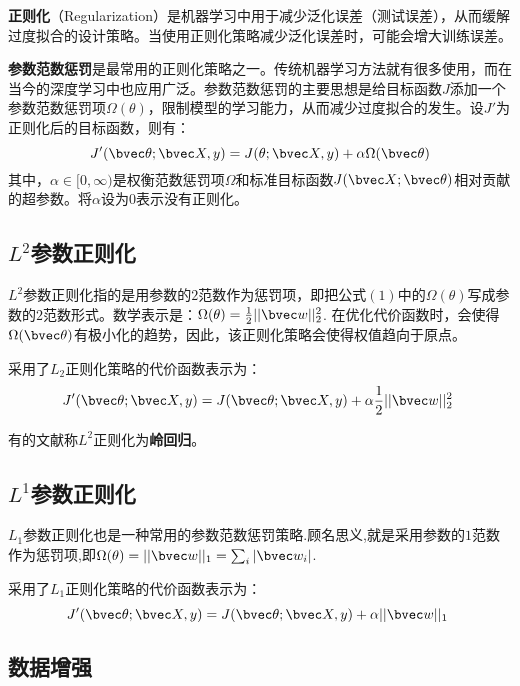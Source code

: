 
\textbf{正则化}（Regularization）是机器学习中用于减少泛化误差（测试误差），从而缓解过度拟合的设计策略。当使用正则化策略减少泛化误差时，可能会增大训练误差。

\textbf{参数范数惩罚}是最常用的正则化策略之一。传统机器学习方法就有很多使用，而在当今的深度学习中也应用广泛。参数范数惩罚的主要思想是给目标函数$J$添加一个参数范数惩罚项$\Omega(\theta)$，限制模型的学习能力，从而减少过度拟合的发生。设$J'$为正则化后的目标函数，则有：
\begin{equation}
J'(\bvec \theta;\bvec X,y)=J(\theta;\bvec X,y)+\alpha\Omega(\bvec \theta)
\end{equation}
其中，$\alpha\in[0,\infty)$是权衡范数惩罚项$\Omega$和标准目标函数$J(\bvec X;\bvec \theta)$相对贡献的超参数。将$\alpha$设为$0$表示没有正则化。


\subsection{$L^2$参数正则化}

$L^2$参数正则化指的是用参数的$2$范数作为惩罚项，即把公式$(1)$中的$\Omega(\theta)$写成参数的$2$范数形式。数学表示是：$\Omega(\theta)=\frac{1}{2}||\bvec w||_2^2$.
在优化代价函数时，会使得$\Omega(\bvec \theta)$有极小化的趋势，因此，该正则化策略会使得权值趋向于原点。

采用了$L_2$正则化策略的代价函数表示为：
\begin{equation}
J'(\bvec \theta;\bvec X,y)=J(\bvec \theta;\bvec X,y)+\alpha\frac{1}{2}||\bvec w||_2^2~
\end{equation}

有的文献称$L^2$正则化为\textbf{岭回归}。


\subsection{$L^1$参数正则化}

$L_1$参数正则化也是一种常用的参数范数惩罚策略.顾名思义,就是采用参数的$1$范数作为惩罚项,即$\Omega(\theta)=||\bvec w||_1=\sum_i|\bvec w_i|$.

采用了$L_1$正则化策略的代价函数表示为：
\begin{equation}
J'(\bvec \theta;\bvec X,y)=J(\bvec \theta;\bvec X,y)+\alpha||\bvec w||_1~
\end{equation}


\subsection{数据增强}

